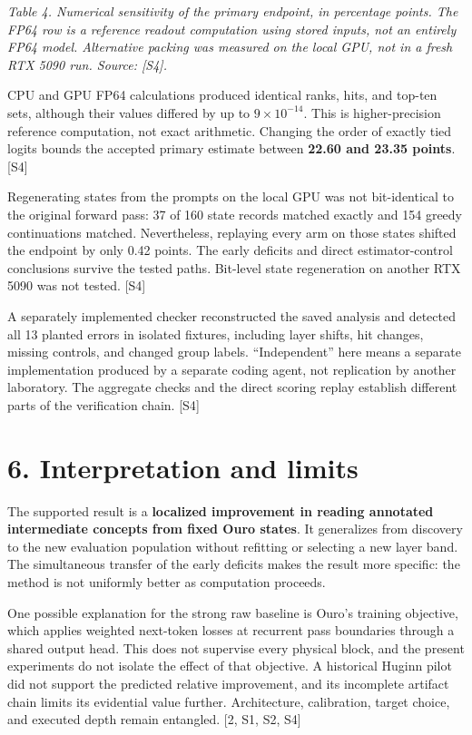 \documentclass[
  11pt,
  a4paper,
]{article}
\begin{document}
\emph{Table 4. Numerical sensitivity of the primary endpoint, in
percentage points. The FP64 row is a reference readout computation using
stored inputs, not an entirely FP64 model. Alternative packing was
measured on the local GPU, not in a fresh RTX 5090 run. Source:
{[}S4{]}.}

CPU and GPU FP64 calculations produced identical ranks, hits, and
top-ten sets, although their values differed by up to
\(9\times10^{-14}\). This is higher-precision reference computation, not
exact arithmetic. Changing the order of exactly tied logits bounds the
accepted primary estimate between \textbf{22.60 and 23.35 points}.
{[}S4{]}

Regenerating states from the prompts on the local GPU was not
bit-identical to the original forward pass: 37 of 160 state records
matched exactly and 154 greedy continuations matched. Nevertheless,
replaying every arm on those states shifted the endpoint by only 0.42
points. The early deficits and direct estimator-control conclusions
survive the tested paths. Bit-level state regeneration on another RTX
5090 was not tested. {[}S4{]}

A separately implemented checker reconstructed the saved analysis and
detected all 13 planted errors in isolated fixtures, including layer
shifts, hit changes, missing controls, and changed group labels.
``Independent'' here means a separate implementation produced by a
separate coding agent, not replication by another laboratory. The
aggregate checks and the direct scoring replay establish different parts
of the verification chain. {[}S4{]}

\section{6. Interpretation and limits}\label{interpretation-and-limits}

The supported result is a \textbf{localized improvement in reading
annotated intermediate concepts from fixed Ouro states}. It generalizes
from discovery to the new evaluation population without refitting or
selecting a new layer band. The simultaneous transfer of the early
deficits makes the result more specific: the method is not uniformly
better as computation proceeds.

One possible explanation for the strong raw baseline is Ouro's training
objective, which applies weighted next-token losses at recurrent pass
boundaries through a shared output head. This does not supervise every
physical block, and the present experiments do not isolate the effect of
that objective. A historical Huginn pilot did not support the predicted
relative improvement, and its incomplete artifact chain limits its
evidential value further. Architecture, calibration, target choice, and
executed depth remain entangled. {[}2, S1, S2, S4{]}
\end{document}
